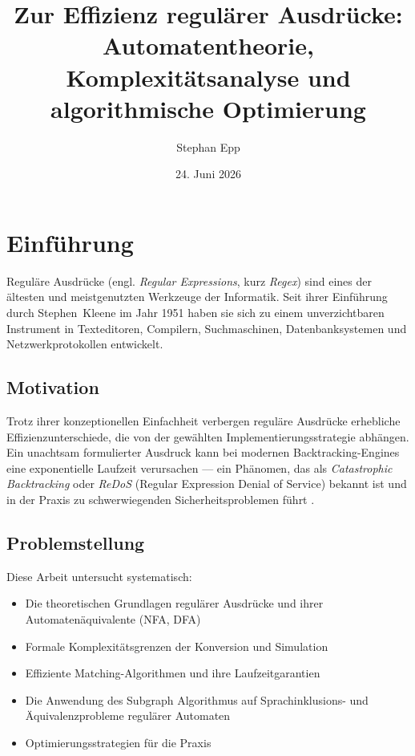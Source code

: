 ﻿\documentclass[a4paper,12pt]{article}
\title{Zur Effizienz regulärer Ausdrücke:\\
Automatentheorie, Komplexitätsanalyse und\\
algorithmische Optimierung}
\author{Stephan Epp}
\date{24. Juni 2026}
\theoremstyle{definition}
\begin{document}
\maketitle
\tableofcontents
\newpage

\section{Einführung}

Reguläre Ausdrücke (engl. \emph{Regular Expressions}, kurz \emph{Regex}) sind
eines der ältesten und meistgenutzten Werkzeuge der Informatik. Seit ihrer
Einführung durch Stephen~Kleene im Jahr 1951 \cite{kleene1951} haben sie sich zu
einem unverzichtbaren Instrument in Texteditoren, Compilern, Suchmaschinen,
Datenbanksystemen und Netzwerkprotokollen entwickelt.

\subsection{Motivation}

Trotz ihrer konzeptionellen Einfachheit verbergen reguläre Ausdrücke erhebliche
Effizienzunterschiede, die von der gewählten Implementierungsstrategie abhängen.
Ein unachtsam formulierter Ausdruck kann bei modernen Backtracking-Engines eine
exponentielle Laufzeit verursachen --- ein Phänomen, das als
\emph{Catastrophic Backtracking} oder \emph{ReDoS} (Regular Expression
Denial of Service) bekannt ist und in der Praxis zu schwerwiegenden
Sicherheitsproblemen führt \cite{shen2018}.

\subsection{Problemstellung}

Diese Arbeit untersucht systematisch:

\begin{itemize}
	\item Die theoretischen Grundlagen regulärer Ausdrücke und ihrer
	      Automatenäquivalente (NFA, DFA)
	\item Formale Komplexitätsgrenzen der Konversion und Simulation
	\item Effiziente Matching-Algorithmen und ihre Laufzeitgarantien
	\item Die Anwendung des Subgraph Algorithmus auf Sprachinklusions- und
	      Äquivalenzprobleme regulärer Automaten
	\item Optimierungsstrategien für die Praxis
\end{itemize}
\end{document}
